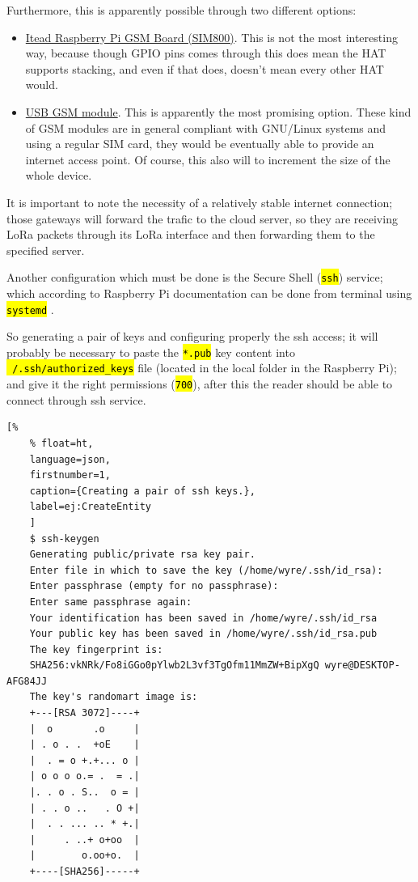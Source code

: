 \documentclass[11pt,a4paper,dvipsnames,twoside]{article}
\newcommand{\cmd}[1] {\hl{\texttt{#1}}}
\begin{document}
\begin{itemize}
  Furthermore, this is apparently possible through two different options:
    \begin{itemize}
      \item \href{https://www.itead.cc/wiki/RPI_SIM800_GSM/GPRS_ADD-ON_V2.0}{Itead Raspberry Pi GSM Board (SIM800)}. This is not the most interesting way, because though GPIO pins comes through this does mean the HAT supports stacking, and even if that does, doesn't mean every other HAT would.
      \item \href{https://tutorials-raspberrypi.com/raspberry-pi-gsm-module-mobile-internet-lte-3g-umts/}{USB GSM module}. This is apparently the most promising option. These kind of GSM modules are in general compliant with GNU/Linux systems and using a regular SIM card, they would be eventually able to provide an internet access point. Of course, this also will to increment the size of the whole device.
    \end{itemize}
\end{itemize}

It is important to note the necessity of a relatively stable internet connection; those gateways will forward the trafic to the cloud server, so they are receiving LoRa packets through its LoRa interface and then forwarding them to the specified server. 

Another configuration which must be done is the Secure Shell (\cmd{ssh}) service; which according to Raspberry Pi documentation can be done from terminal using \cmd{systemd} \cite{RaspiSSH}. 

So generating a pair of keys and configuring properly the ssh access; it will probably be necessary to paste the \cmd{*.pub} key content into \cmd{~/.ssh/authorized\_keys} file (located in the local folder in the Raspberry Pi); and give it the right permissions (\cmd{700}), after this the reader should be able to connect through ssh service.

\begin{lstlisting}[%
    % float=ht,
    language=json,
    firstnumber=1,
    caption={Creating a pair of ssh keys.},
    label=ej:CreateEntity
    ]
    $ ssh-keygen
    Generating public/private rsa key pair.
    Enter file in which to save the key (/home/wyre/.ssh/id_rsa): 
    Enter passphrase (empty for no passphrase): 
    Enter same passphrase again: 
    Your identification has been saved in /home/wyre/.ssh/id_rsa
    Your public key has been saved in /home/wyre/.ssh/id_rsa.pub
    The key fingerprint is:
    SHA256:vkNRk/Fo8iGGo0pYlwb2L3vf3TgOfm11MmZW+BipXgQ wyre@DESKTOP-AFG84JJ
    The key's randomart image is:
    +---[RSA 3072]----+
    |  o       .o     |
    | . o . .  +oE    |
    |  . = o +.+... o |
    | o o o o.= .  = .|
    |. . o . S..  o = |
    | . . o ..   . O +|
    |  . . ... .. * +.|
    |     . ..+ o+oo  |
    |        o.oo+o.  |
    +----[SHA256]-----+
\end{lstlisting}
\end{document}
